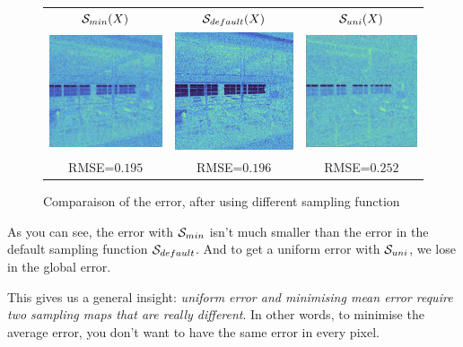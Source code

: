 \documentclass{classeENS}
\begin{document}
\begin{figure}[H]
    \centering
    \caption{Comparaison of the error, after using different sampling function}
    \begin{tabular}{ccc}
    $\mathcal S_{min}(X)$ & $\mathcal S_{default}(X)$ & $\mathcal S_{uni}(X)$ \\
    \includegraphics[width=45mm]{image/without/RMSE_min.png}
    & \includegraphics[width=45mm]{image/without/RMSE_uni.png}
    & \includegraphics[width=45mm]{image/without/RMSE_mean.png} \\
    RMSE=$0.195$ & RMSE=$0.196$ & RMSE=$0.252$
    \end{tabular}
\end{figure}
As you can see, the error with $\mathcal S_{min}$ isn't much smaller than 
the error in the default sampling function $\mathcal S_{default}$.
 And to get a uniform error with $\mathcal S_{uni}$, we lose in the global error. 
\par This gives us a general insight: \textit{uniform error
 and minimising mean error require two sampling maps that 
 are really different}. In other words, to minimise the 
 average error, you don't want to have the same error in 
 every pixel.
\end{document}
